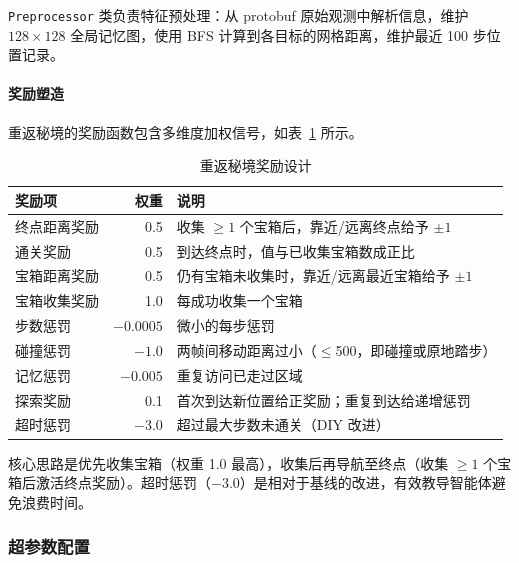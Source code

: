 \documentclass[12pt,a4paper]{article}
\begin{document}
\texttt{Preprocessor} 类负责特征预处理：从 protobuf 原始观测中解析信息，维护 $128\times128$ 全局记忆图，使用 BFS 计算到各目标的网格距离，维护最近 100 步位置记录。

\paragraph{奖励塑造}
重返秘境的奖励函数包含多维度加权信号，如表~\ref{tab:hw2_reward} 所示。

\begin{table}[htbp]
\centering
\caption{重返秘境奖励设计}\label{tab:hw2_reward}
\begin{tabularx}{\textwidth}{lrX}
\toprule
\textbf{奖励项} & \textbf{权重} & \textbf{说明} \\
\midrule
终点距离奖励   & 0.5    & 收集 $\geq1$ 个宝箱后，靠近/远离终点给予 $\pm1$ \\
通关奖励       & 0.5    & 到达终点时，值与已收集宝箱数成正比 \\
宝箱距离奖励   & 0.5    & 仍有宝箱未收集时，靠近/远离最近宝箱给予 $\pm1$ \\
宝箱收集奖励   & 1.0    & 每成功收集一个宝箱 \\
步数惩罚       & $-0.0005$ & 微小的每步惩罚 \\
碰撞惩罚       & $-1.0$   & 两帧间移动距离过小（$\leq$500，即碰撞或原地踏步） \\
记忆惩罚       & $-0.005$ & 重复访问已走过区域 \\
探索奖励       & 0.1    & 首次到达新位置给正奖励；重复到达给递增惩罚 \\
超时惩罚       & $-3.0$   & 超过最大步数未通关（DIY 改进） \\
\bottomrule
\end{tabularx}
\end{table}

核心思路是优先收集宝箱（权重 1.0 最高），收集后再导航至终点（收集 $\geq1$ 个宝箱后激活终点奖励）。超时惩罚（$-3.0$）是相对于基线的改进，有效教导智能体避免浪费时间。

\subsubsection{超参数配置}
\end{document}
